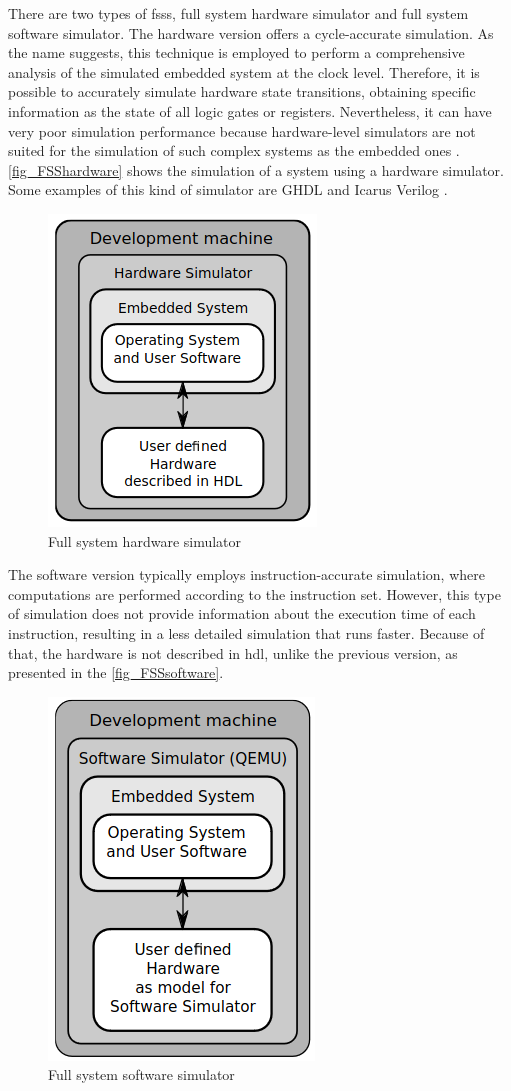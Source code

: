 There are two types of \glspl{fss}, full system hardware simulator and full system software simulator. The hardware version offers a 
cycle-accurate simulation. As the name suggests, this technique is employed to perform a comprehensive analysis of the simulated embedded system 
at the clock level. Therefore, it is possible to accurately simulate hardware state transitions, obtaining specific information as the state of 
all logic gates or registers. Nevertheless, it can have very poor simulation performance because hardware-level simulators are not suited for 
the simulation of such complex systems as the embedded ones \cite{TypesOfFSS}. \autoref{fig_FSShardware} shows the simulation of a system using 
a hardware simulator. Some examples of this kind of simulator are GHDL \cite{GHDLMainHomePage} and Icarus Verilog \cite{williams2002icarus}.

\begin{figure}[H]
	\centering
 	\includegraphics[width=0.3\linewidth]{Images/FSShardware.png}
 	\caption{Full system hardware simulator \cite{TypesOfFSS}}
	 \label{fig_FSShardware}
\end{figure}

The software version typically employs instruction-accurate simulation, where computations are performed according to the instruction set. 
However, this type of simulation does not provide information about the execution time of each instruction, resulting in a less detailed simulation 
that runs faster. Because of that, the hardware is not described in \gls{hdl}, unlike the previous version, as presented in the 
\autoref{fig_FSSsoftware}.

\begin{figure}[H]
	\centering
 	\includegraphics[width=0.3\linewidth]{Images/FSSsoftware.png}
 	\caption{Full system software simulator \cite{TypesOfFSS}}
	 \label{fig_FSSsoftware}
\end{figure}

